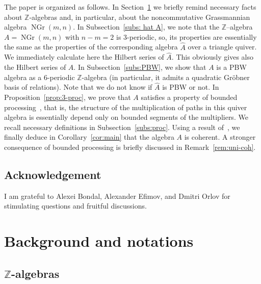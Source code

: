 \documentclass{amsart}
\numberwithin{equation}{section}
\theoremstyle{plain}
\theoremstyle{definition}
\begin{document}
The paper is organized as follows. In Section~\ref{sec:defs} we briefly remind necessary facts about ${\ensuremath{\mathbb Z}}$-algebras and, in particular, about the noncommutative Grassmannian algebra ${\mathop{\mathrm{NGr}}\nolimits}(m,n)$.  
In Subsection~\ref{subs: hat A},  we note that the ${\ensuremath{\mathbb Z}}$--algebra $A ={\mathop{\mathrm{NGr}}\nolimits}(m,n)$ with $n-m=2$ is 3-periodic, so, its properties are essentially the same as the properties of the corresponding algebra $\hat A$ over a triangle quiver. We immediately calculate here the Hilbert series of $\hat A$. This obviously gives also the Hilbert series of $A$. 
In Subsection~\ref{subs:PBW}, we show that $A$ is a PBW algebra as a 6-periodic ${\ensuremath{\mathbb Z}}$-algebra (in particular, it admits a quadratic Gr\"obner basis of relations). Note that we do not know if $\hat A$ is PBW or not. 
In Proposition~\ref{prop:3-proc}, we prove that $A$ satisfies a property of bounded processing~\cite{pi01}, 
that is, the structure of the multiplication of paths in this quiver algebra is essentially depend 
only on bounded segments of the multipliers. We recall necessary definitions in  
Subsection~\ref{subs:proc}.
Using a result of~\cite{pi01}, we finally  deduce in Corollary~\ref{cor:main} that the algebra $A$ is coherent. A stronger consequence of bounded processing is briefly discussed in Remark~\ref{rem:uni-coh}.

\subsection{Acknowledgement}

I am grateful to Alexei Bondal, Alexander Efimov, and Dmitri Orlov for stimulating questions and fruitful discussions.

\section{Background and notations}

\label{sec:defs}

\subsection{{\ensuremath{\mathbb Z}}-algebras}
\label{subs:z}
\end{document}
